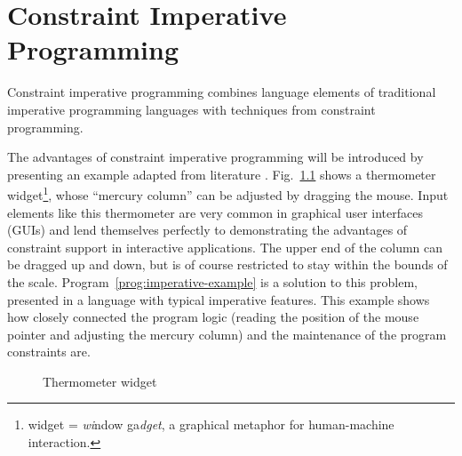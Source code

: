 
\chapter{Constraint Imperative Programming}
\label{cha:constraint-imperative-programming}

Constraint imperative programming combines language elements of
traditional imperative programming languages with techniques from
constraint programming.

The advantages of constraint imperative programming will be introduced
by presenting an example adapted from literature \cite{lopez97phd,
  lopez94kaleidoscope}.  Fig.~\ref{pic:temperature} shows a
thermometer widget\footnote{widget = {\em wi}ndow ga{\em dget}, a
  graphical metaphor for human-machine interaction.}, whose ``mercury
column'' can be adjusted by dragging the mouse.  Input elements like
this thermometer are very common in graphical user interfaces (GUIs)
and lend themselves perfectly to demonstrating the advantages of
constraint support in interactive applications.  The upper end of the
column can be dragged up and down, but is of course restricted to stay
within the bounds of the scale.  Program~\ref{prog:imperative-example}
is a solution to this problem, presented in a language with typical
imperative features.  This example shows how closely connected the
program logic (reading the position of the mouse pointer and adjusting
the mercury column) and the maintenance of the program constraints
are.
%
\begin{figure}[h]
\begin{center}

\end{center}
\caption{Thermometer widget}
\label{pic:temperature}
\end{figure}

